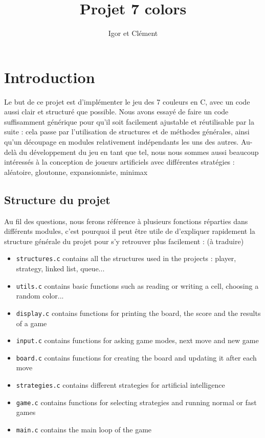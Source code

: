 \documentclass[12pt,L,fira-sans]{paper}
\title{Projet 7 colors}
\author{Igor \maj{Martayan} et Clément \maj{Morand}}
\begin{document}
\maketitle

\section*{Introduction}

Le but de ce projet est d'implémenter le jeu des 7 couleurs en C, avec un code aussi clair et structuré que possible.
Nous avons essayé de faire un code suffisamment générique pour qu'il soit facilement ajustable et réutilisable par la suite : cela passe par l'utilisation de structures et de méthodes générales, ainsi qu'un découpage en modules relativement indépendants les uns des autres.
Au-delà du développement du jeu en tant que tel, nous nous sommes aussi beaucoup intéressés à la conception de joueurs artificiels avec différentes stratégies : aléatoire, gloutonne, expansionniste, minimax\etc

\subsection*{Structure du projet}

Au fil des questions, nous ferons référence à plusieurs fonctions réparties dans différents modules, c'est pourquoi il peut être utile de d'expliquer rapidement la structure générale du projet pour s'y retrouver plus facilement :
(à traduire)

\begin{itemize}
    \item \verb|structures.c| contains all the structures used in the projects : player, strategy, linked list, queue...
    \item \verb|utils.c| contains basic functions such as reading or writing a cell, choosing a random color...
    \item \verb|display.c| contains functions for printing the board, the score and the results of a game
    \item \verb|input.c| contains functions for asking game modes, next move and new game
    \item \verb|board.c| contains functions for creating the board and updating it after each move
    \item \verb|strategies.c| contains different strategies for artificial intelligence
    \item \verb|game.c| contains functions for selecting strategies and running normal or fast games
    \item \verb|main.c| contains the main loop of the game
\end{itemize}
\end{document}
